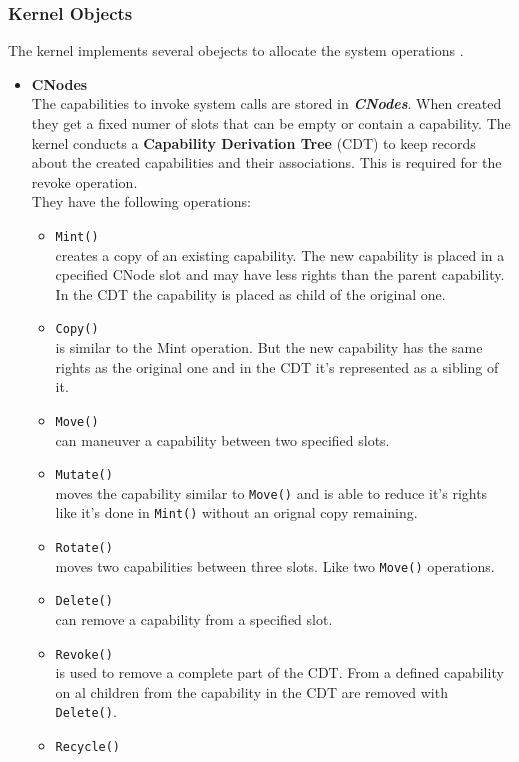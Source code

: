 \documentclass[pdftex,11pt,a4paper,twoside]{article}
\begin{document}
	\subsubsection{Kernel Objects}\label{sec:KernelObjects}
	The kernel implements several obejects to allocate the system operations \cite{Manual}.
	\begin{itemize}
	\item \textbf{CNodes} \\
	The capabilities to invoke system calls are stored in \textbf{\textit{CNodes}}. When created they get a fixed numer of slots that can be empty or contain a capability. 
	The kernel conducts a \textbf{Capability Derivation Tree} (CDT) to keep records about the created capabilities and their associations. This is required for the revoke operation. \\ 
	They have the following operations:
\begin{itemize}
\item \texttt{Mint()} \\
creates a copy of an existing capability. The new capability is placed in a cpecified CNode slot and may have less rights than the parent capability. In the CDT the capability is placed as child of the original one. 
\item \texttt{Copy()} \\
is similar to the Mint operation. But the new capability has the same rights as the original one and in the CDT it's represented as a sibling of it. 
\item \texttt{Move()} \\
can maneuver a capability between two specified slots. 
\item \texttt{Mutate()} \\
moves the capability similar to \texttt{Move()} and is able to reduce it's rights like it's done in \texttt{Mint()} without an orignal copy remaining.
\item \texttt{Rotate()} \\
moves two capabilities between three slots. Like two \texttt{Move()} operations. 
\item \texttt{Delete()} \\
can remove a capability from a specified slot.
\item \texttt{Revoke()} \\
is used to remove a complete part of the CDT. From a defined capability on al children from the capability in the CDT are removed with \texttt{Delete()}. 
\item \texttt{Recycle()} \\

\end{itemize}
\end{itemize}
\end{document}
